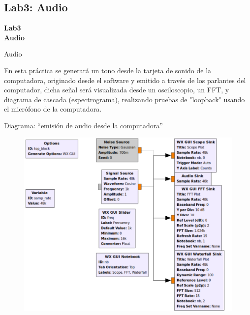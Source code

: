 \subsection{Lab3: Audio}
\begin{frame}{}


\bfseries{\textrm{\LARGE Lab3\\ \Large Audio}}
\raggedright
\end{frame}

\begin{frame}{Audio }



En esta práctica se generará un tono desde la tarjeta de sonido de la computadora, originado desde el software y emitido a través de los parlantes del computador, dicha señal será visualizada desde un osciloscopio, un FFT, y diagrama de cascada (espectrograma), realizando pruebas de "loopback" usando el micrófono de la computadora.

\end{frame}

\begin{frame}{Diagrama:  “emisión de audio desde la computadora”}

\begin{figure}

\begin{center}
\vspace{-0.3cm}
\includegraphics[width=.7\textwidth]{parte1/lab3/pdf/lab3_1.pdf}
\end{center}
\end{figure}

\end{frame}

